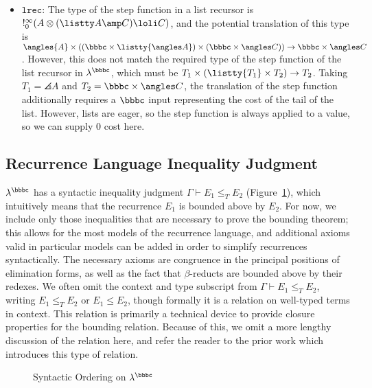\begin{itemize}
  \item \sloppypar $\texttt{lrec}$: The type of the step function in a
    list recursor is $!^\infty_0(A \otimes (\listty A \amp C) \loli C)$,
    and the potential translation of this type is
    \mbox{$\angles{A} \times \left(\left(\bbbc \times \listty {\angles
      A}\right) \times \left(\bbbc \times \angles C\right)\right) \to
    \bbbc \times \angles C$}. However, this does not match the
    required type of the step function of the list recursor in
    $\lambda^\bbbc$, which must be $T_1 \times (\listty {T_1} \times
    T_2) \to T_2$.  Taking $T_1 = \angles{A}$ and $T_2 = \bbbc \times
    \angles C$, the translation of the step function additionally
    requires a $\bbbc$ input representing the cost of the tail of the
    list.  However, lists are eager, so the step function is always applied
    to a value, so we can supply $0$ cost here.
\end{itemize}


\subsection{Recurrence Language Inequality Judgment}\label{sec:so}

$\lambda^\bbbc$ has a syntactic inequality judgment $\Gamma
\vdash E_1 \leq_T E_2$ (Figure~\ref{fig:syn-ord}), which intuitively means
that the recurrence $E_1$ is bounded above by $E_2$.  For now, we
include only those inequalities that are necessary to prove the
bounding theorem; this allows for the most models of the
recurrence language, and additional axioms valid in particular models
can be added in order to simplify recurrences syntactically.  The
necessary axioms are congruence in the principal positions of
elimination forms, as well as the fact that $\beta$-reducts are bounded
above by their redexes.  We often omit the context and type subscript
from $\Gamma \vdash E_1 \leq_T E_2$, writing $E_1 \leq_T E_2$ or $E_1
\leq E_2$, though formally it is a relation on well-typed terms in
context. This relation is primarily a technical device to provide closure
properties for the bounding relation. Because of this, we omit a more lengthy
discussion of the relation here, and refer the reader to the prior work
\cite{danner-et-al:icfp15} which introduces this type of relation.

\begin{figure}
  
  \vspace{-0.25in}
  \caption{Syntactic Ordering on $\lambda^\bbbc$}
  \label{fig:syn-ord}
\end{figure}

